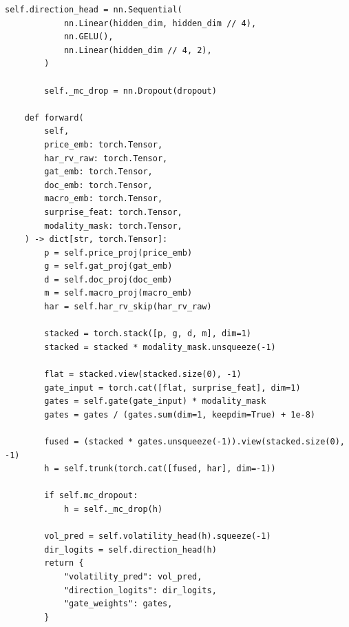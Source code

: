 \documentclass[12pt,a4paper]{article}
\begin{document}
\begin{lstlisting}[caption={Phase 14 Fusion Model with HAR-RV skip (src/models/fusion\_model.py)}]
        self.direction_head = nn.Sequential(
            nn.Linear(hidden_dim, hidden_dim // 4),
            nn.GELU(),
            nn.Linear(hidden_dim // 4, 2),
        )

        self._mc_drop = nn.Dropout(dropout)

    def forward(
        self,
        price_emb: torch.Tensor,
        har_rv_raw: torch.Tensor,
        gat_emb: torch.Tensor,
        doc_emb: torch.Tensor,
        macro_emb: torch.Tensor,
        surprise_feat: torch.Tensor,
        modality_mask: torch.Tensor,
    ) -> dict[str, torch.Tensor]:
        p = self.price_proj(price_emb)
        g = self.gat_proj(gat_emb)
        d = self.doc_proj(doc_emb)
        m = self.macro_proj(macro_emb)
        har = self.har_rv_skip(har_rv_raw)

        stacked = torch.stack([p, g, d, m], dim=1)
        stacked = stacked * modality_mask.unsqueeze(-1)

        flat = stacked.view(stacked.size(0), -1)
        gate_input = torch.cat([flat, surprise_feat], dim=1)
        gates = self.gate(gate_input) * modality_mask
        gates = gates / (gates.sum(dim=1, keepdim=True) + 1e-8)

        fused = (stacked * gates.unsqueeze(-1)).view(stacked.size(0), -1)
        h = self.trunk(torch.cat([fused, har], dim=-1))

        if self.mc_dropout:
            h = self._mc_drop(h)

        vol_pred = self.volatility_head(h).squeeze(-1)
        dir_logits = self.direction_head(h)
        return {
            "volatility_pred": vol_pred,
            "direction_logits": dir_logits,
            "gate_weights": gates,
        }
\end{lstlisting}
\end{document}
